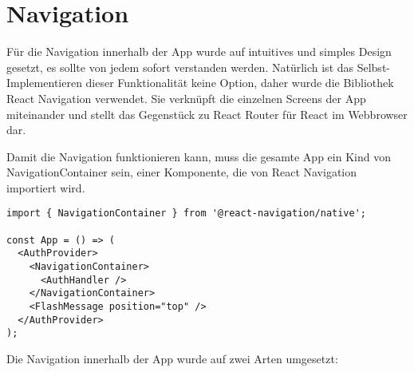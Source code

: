 \chapter{Navigation}
Für die Navigation innerhalb der App wurde auf intuitives und simples Design gesetzt, es sollte von
jedem sofort verstanden werden. Natürlich ist das Selbst-Implementieren dieser Funktionalität keine
Option, daher wurde die Bibliothek React Navigation verwendet. Sie verknüpft die einzelnen Screens
der App miteinander und stellt das Gegenstück zu React Router für React im Webbrowser dar.

Damit die Navigation funktionieren kann, muss die gesamte App ein Kind von NavigationContainer sein,
einer Komponente, die von React Navigation importiert wird.

\begin{lstlisting}
import { NavigationContainer } from '@react-navigation/native';

const App = () => (
  <AuthProvider>
    <NavigationContainer>
      <AuthHandler />
    </NavigationContainer>
    <FlashMessage position="top" />
  </AuthProvider>
);
\end{lstlisting}

Die Navigation innerhalb der App wurde auf zwei Arten umgesetzt:



\newpage

